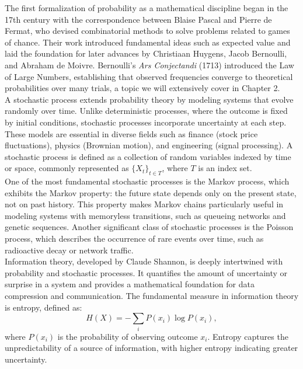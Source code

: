 \documentclass{book}
\begin{document}
The first formalization of probability as a mathematical discipline began in the 17th century with the correspondence between Blaise Pascal and Pierre de Fermat, who devised combinatorial methods to solve problems related to games of chance. Their work introduced fundamental ideas such as expected value and laid the foundation for later advances by Christiaan Huygens, Jacob Bernoulli, and Abraham de Moivre. Bernoulli’s \textit{Ars Conjectandi} (1713) introduced the Law of Large Numbers, establishing that observed frequencies converge to theoretical probabilities over many trials, a topic we will extensively cover in Chapter 2.\\

A stochastic process extends probability theory by modeling systems that evolve randomly over time. Unlike deterministic processes, where the outcome is fixed by initial conditions, stochastic processes incorporate uncertainty at each step. These models are essential in diverse fields such as finance (stock price fluctuations), physics (Brownian motion), and engineering (signal processing). A stochastic process is defined as a collection of random variables indexed by time or space, commonly represented as $\{X_t\}_{t \in T}$, where $T$ is an index set.\\

One of the most fundamental stochastic processes is the Markov process, which exhibits the Markov property: the future state depends only on the present state, not on past history. This property makes Markov chains particularly useful in modeling systems with memoryless transitions, such as queueing networks and genetic sequences. Another significant class of stochastic processes is the Poisson process, which describes the occurrence of rare events over time, such as radioactive decay or network traffic.\\

Information theory, developed by Claude Shannon, is deeply intertwined with probability and stochastic processes. It quantifies the amount of uncertainty or surprise in a system and provides a mathematical foundation for data compression and communication. The fundamental measure in information theory is entropy, defined as:
\begin{equation}
    H(X) = -\sum_{i} P(x_i) \log P(x_i),
\end{equation}
where $P(x_i)$ is the probability of observing outcome $x_i$. Entropy captures the unpredictability of a source of information, with higher entropy indicating greater uncertainty.\\
\end{document}
